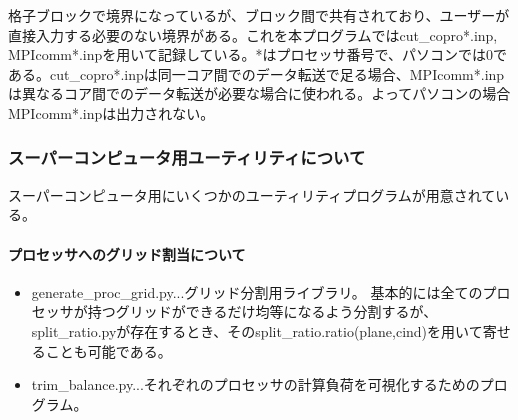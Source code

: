 \documentclass{jsarticle}
\begin{document}
格子ブロックで境界になっているが、ブロック間で共有されており、ユーザーが直接入力する必要のない境界がある。これを本プログラムではcut\_copro*.inp, MPIcomm*.inpを用いて記録している。*はプロセッサ番号で、パソコンでは0である。cut\_copro*.inpは同一コア間でのデータ転送で足る場合、MPIcomm*.inpは異なるコア間でのデータ転送が必要な場合に使われる。よってパソコンの場合MPIcomm*.inpは出力されない。

\subsubsection{スーパーコンピュータ用ユーティリティについて}
スーパーコンピュータ用にいくつかのユーティリティプログラムが用意されている。
\paragraph{プロセッサへのグリッド割当について}
\begin{itemize}
\item generate\_proc\_grid.py...グリッド分割用ライブラリ。
基本的には全てのプロセッサが持つグリッドができるだけ均等になるよう分割するが、split\_ratio.pyが存在するとき、そのsplit\_ratio.ratio(plane,cind)を用いて寄せることも可能である。
\item trim\_balance.py...それぞれのプロセッサの計算負荷を可視化するためのプログラム。
\end{itemize}
\end{document}
